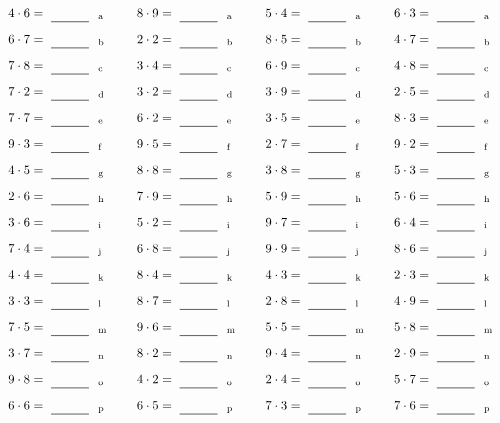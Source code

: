 \documentclass
[
  draft    = true,
  fontsize = 11pt,
  parskip  = half-
]
{scrartcl}
\begin{document}
\par\vfill\par
\begin{align*}
    \pline{4\cdot6}&=\rline{a}
  & \pline{8\cdot9}&=\rline{a}
  & \pline{5\cdot4}&=\rline{a}
  & \pline{6\cdot3}&=\rline{a} \\[1ex]
    \pline{6\cdot7}&=\rline{b}
  & \pline{2\cdot2}&=\rline{b}
  & \pline{8\cdot5}&=\rline{b}
  & \pline{4\cdot7}&=\rline{b} \\[1ex]
    \pline{7\cdot8}&=\rline{c}
  & \pline{3\cdot4}&=\rline{c}
  & \pline{6\cdot9}&=\rline{c}
  & \pline{4\cdot8}&=\rline{c} \\[1ex]
    \pline{7\cdot2}&=\rline{d}
  & \pline{3\cdot2}&=\rline{d}
  & \pline{3\cdot9}&=\rline{d}
  & \pline{2\cdot5}&=\rline{d} \\[1ex]
    \pline{7\cdot7}&=\rline{e}
  & \pline{6\cdot2}&=\rline{e}
  & \pline{3\cdot5}&=\rline{e}
  & \pline{8\cdot3}&=\rline{e} \\[1ex]
    \pline{9\cdot3}&=\rline{f}
  & \pline{9\cdot5}&=\rline{f}
  & \pline{2\cdot7}&=\rline{f}
  & \pline{9\cdot2}&=\rline{f} \\[1ex]
    \pline{4\cdot5}&=\rline{g}
  & \pline{8\cdot8}&=\rline{g}
  & \pline{3\cdot8}&=\rline{g}
  & \pline{5\cdot3}&=\rline{g} \\[1ex]
    \pline{2\cdot6}&=\rline{h}
  & \pline{7\cdot9}&=\rline{h}
  & \pline{5\cdot9}&=\rline{h}
  & \pline{5\cdot6}&=\rline{h} \\[1ex]
    \pline{3\cdot6}&=\rline{i}
  & \pline{5\cdot2}&=\rline{i}
  & \pline{9\cdot7}&=\rline{i}
  & \pline{6\cdot4}&=\rline{i} \\[1ex]
    \pline{7\cdot4}&=\rline{j}
  & \pline{6\cdot8}&=\rline{j}
  & \pline{9\cdot9}&=\rline{j}
  & \pline{8\cdot6}&=\rline{j} \\[1ex]
    \pline{4\cdot4}&=\rline{k}
  & \pline{8\cdot4}&=\rline{k}
  & \pline{4\cdot3}&=\rline{k}
  & \pline{2\cdot3}&=\rline{k} \\[1ex]
    \pline{3\cdot3}&=\rline{l}
  & \pline{8\cdot7}&=\rline{l}
  & \pline{2\cdot8}&=\rline{l}
  & \pline{4\cdot9}&=\rline{l} \\[1ex]
    \pline{7\cdot5}&=\rline{m}
  & \pline{9\cdot6}&=\rline{m}
  & \pline{5\cdot5}&=\rline{m}
  & \pline{5\cdot8}&=\rline{m} \\[1ex]
    \pline{3\cdot7}&=\rline{n}
  & \pline{8\cdot2}&=\rline{n}
  & \pline{9\cdot4}&=\rline{n}
  & \pline{2\cdot9}&=\rline{n} \\[1ex]
    \pline{9\cdot8}&=\rline{o}
  & \pline{4\cdot2}&=\rline{o}
  & \pline{2\cdot4}&=\rline{o}
  & \pline{5\cdot7}&=\rline{o} \\[1ex]
    \pline{6\cdot6}&=\rline{p}
  & \pline{6\cdot5}&=\rline{p}
  & \pline{7\cdot3}&=\rline{p}
  & \pline{7\cdot6}&=\rline{p}
\end{align*}
\end{document}
